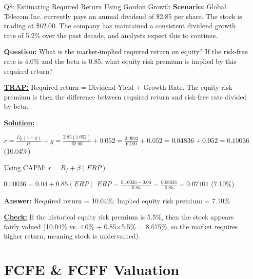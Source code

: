 \documentclass{beamer}
\renewcommand{\scriptsize}{\fontsize{6pt}{7pt}\selectfont}
\begin{document}
	\begin{frame}{Q8: Estimating Required Return Using Gordon Growth}
		\scriptsize
		\textbf{Scenario:} Global Telecom Inc. currently pays an annual dividend of \$2.85 per share. The stock is trading at \$62.00. The company has maintained a consistent dividend growth rate of 5.2\% over the past decade, and analysts expect this to continue.
		
		\textbf{Question:} What is the market-implied required return on equity? If the risk-free rate is 4.0\% and the beta is 0.85, what equity risk premium is implied by this required return?
		
		\vspace{2pt}
		\underline{\textbf{TRAP:}} Required return = Dividend Yield + Growth Rate. The equity risk premium is then the difference between required return and risk-free rate divided by beta.
		
		\vspace{4pt}
		\underline{\textbf{Solution:}}
		
		$r = \frac{D_0(1+g)}{P_0} + g = \frac{2.85(1.052)}{62.00} + 0.052 = \frac{2.9982}{62.00} + 0.052 = 0.04836 + 0.052 = 0.10036$ (10.04\%)
		
		\vspace{2pt}
		Using CAPM: $r = R_f + \beta(ERP)$
		
		$0.10036 = 0.04 + 0.85(ERP)$
		$ERP = \frac{0.10036 - 0.04}{0.85} = \frac{0.06036}{0.85} = 0.07101$ (7.10\%)
		
		\vspace{2pt}
		\textbf{Answer:} Required return = 10.04\%; Implied equity risk premium = 7.10\%
		
		\vspace{2pt}
		\underline{\textbf{Check:}} If the historical equity risk premium is 5.5\%, then the stock appears fairly valued (10.04\% vs. 4.0\% + 0.85×5.5\% = 8.675\%, so the market requires higher return, meaning stock is undervalued).
	\end{frame}
	
	
	\section{FCFE \& FCFF Valuation}
	
\end{document}
